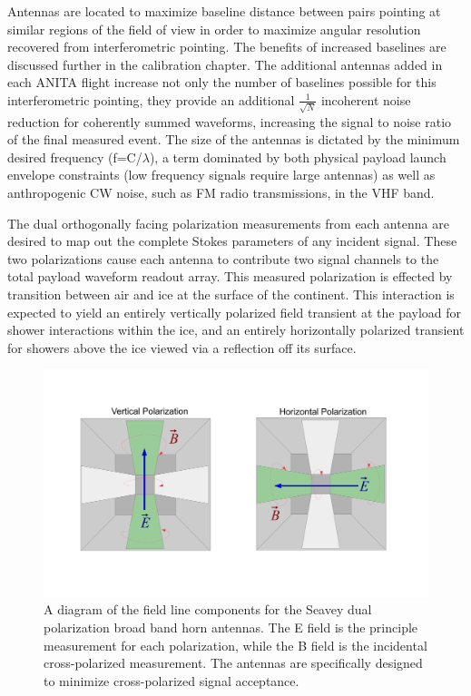 	Antennas are located to maximize baseline distance between pairs pointing at similar regions of the field of view in order to maximize angular resolution recovered from interferometric pointing.  The benefits of increased baselines are discussed further in the calibration chapter.  The additional antennas added in each ANITA flight increase not only the number of baselines possible for this interferometric pointing, they provide an additional $\frac{1}{\sqrt{N}}$ incoherent noise reduction for coherently summed waveforms, increasing the signal to noise ratio of the final measured event.  The size of the antennas is dictated by the minimum desired frequency (f=C/$\lambda$), a term dominated by both physical payload launch envelope constraints (low frequency signals require large antennas) as well as anthropogenic CW noise, such as FM radio transmissions, in the VHF band.  
	
	The dual orthogonally facing polarization measurements from each antenna are desired to map out the complete Stokes parameters of any incident signal.  These two polarizations cause each antenna to contribute two signal channels to the total payload waveform readout array.  This measured polarization is effected by transition between air and ice at the surface of the continent.  This interaction is expected to yield an entirely vertically polarized field transient at the payload for shower interactions within the ice, and an entirely horizontally polarized transient for showers above the ice viewed via a reflection off its surface.  
	
	
	
\begin{figure}
\centering
	\includegraphics[width=\textwidth]{figures/AntennaPol}
	\caption{A diagram of the field line components for the Seavey dual polarization broad band horn antennas.  The E field is the principle measurement for each polarization, while the B field is the incidental cross-polarized measurement.  The antennas are specifically designed to minimize cross-polarized signal acceptance.}
	\label{fig:AntennaPol}
\end{figure}

